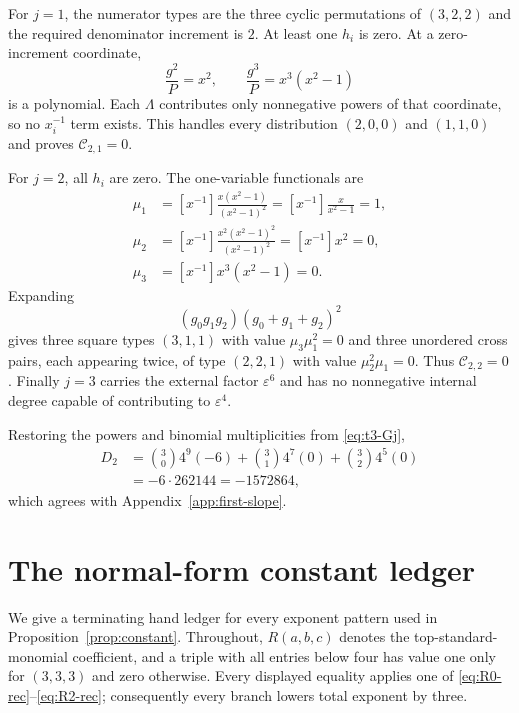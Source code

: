 \documentclass[11pt]{article}
\theoremstyle{definition}
\begin{document}
For $j=1$, the numerator types are the three cyclic permutations of $(3,2,2)$ and the required denominator increment is $2$. At least one $h_i$ is zero. At a zero-increment coordinate,
\[
\frac{g^2}{P}=x^2,
\qquad
\frac{g^3}{P}=x^3(x^2-1)
\]
is a polynomial. Each $\Lambda$ contributes only nonnegative powers of that coordinate, so no $x_i^{-1}$ term exists. This handles every distribution $(2,0,0)$ and $(1,1,0)$ and proves $\mathcal C_{2,1}=0$.

For $j=2$, all $h_i$ are zero. The one-variable functionals are
\begin{align*}
\mu_1
&=[x^{-1}]\frac{x(x^2-1)}{(x^2-1)^2}
=[x^{-1}]\frac{x}{x^2-1}=1,\\
\mu_2
&=[x^{-1}]\frac{x^2(x^2-1)^2}{(x^2-1)^2}
=[x^{-1}]x^2=0,\\
\mu_3
&=[x^{-1}]x^3(x^2-1)=0.
\end{align*}
Expanding
\[
(g_0g_1g_2)(g_0+g_1+g_2)^2
\]
gives three square types $(3,1,1)$ with value $\mu_3\mu_1^2=0$ and three unordered cross pairs, each appearing twice, of type $(2,2,1)$ with value $\mu_2^2\mu_1=0$. Thus $\mathcal C_{2,2}=0$. Finally $j=3$ carries the external factor $\varepsilon^6$ and has no nonnegative internal degree capable of contributing to $\varepsilon^4$.

Restoring the powers and binomial multiplicities from \eqref{eq:t3-Gj},
\begin{align*}
D_2
&=\binom30 4^9(-6)
+\binom31 4^7(0)
+\binom32 4^5(0)\\
&=-6\cdot262144
=-1572864,
\end{align*}
which agrees with Appendix~\ref{app:first-slope}.

\section{The normal-form constant ledger}
\label{app:constant-ledger}

We give a terminating hand ledger for every exponent pattern used in Proposition~\ref{prop:constant}. Throughout, $R(a,b,c)$ denotes the top-standard-monomial coefficient, and a triple with all entries below four has value one only for $(3,3,3)$ and zero otherwise. Every displayed equality applies one of \eqref{eq:R0-rec}--\eqref{eq:R2-rec}; consequently every branch lowers total exponent by three.
\end{document}
